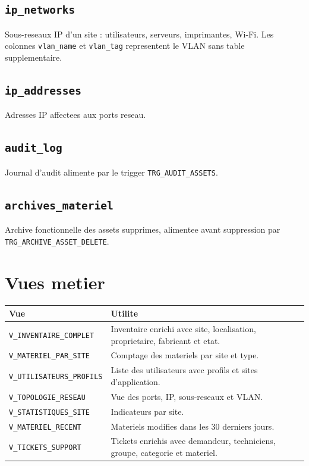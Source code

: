 \documentclass[11pt,a4paper]{article}
\begin{document}
\subsection{\texttt{ip\_networks}}

Sous-reseaux IP d'un site : utilisateurs, serveurs, imprimantes, Wi-Fi. Les colonnes \texttt{vlan\_name} et \texttt{vlan\_tag} representent le VLAN sans table supplementaire.

\subsection{\texttt{ip\_addresses}}

Adresses IP affectees aux ports reseau.

\subsection{\texttt{audit\_log}}

Journal d'audit alimente par le trigger \texttt{TRG\_AUDIT\_ASSETS}.

\subsection{\texttt{archives\_materiel}}

Archive fonctionnelle des assets supprimes, alimentee avant suppression par \texttt{TRG\_ARCHIVE\_ASSET\_DELETE}.

\section{Vues metier}

\begin{longtable}{|p{5cm}|p{9cm}|}
\hline
\textbf{Vue} & \textbf{Utilite} \\
\hline
\texttt{V\_INVENTAIRE\_COMPLET} & Inventaire enrichi avec site, localisation, proprietaire, fabricant et etat. \\
\hline
\texttt{V\_MATERIEL\_PAR\_SITE} & Comptage des materiels par site et type. \\
\hline
\texttt{V\_UTILISATEURS\_PROFILS} & Liste des utilisateurs avec profils et sites d'application. \\
\hline
\texttt{V\_TOPOLOGIE\_RESEAU} & Vue des ports, IP, sous-reseaux et VLAN. \\
\hline
\texttt{V\_STATISTIQUES\_SITE} & Indicateurs par site. \\
\hline
\texttt{V\_MATERIEL\_RECENT} & Materiels modifies dans les 30 derniers jours. \\
\hline
\texttt{V\_TICKETS\_SUPPORT} & Tickets enrichis avec demandeur, techniciens, groupe, categorie et materiel. \\
\hline
\end{longtable}
\end{document}
